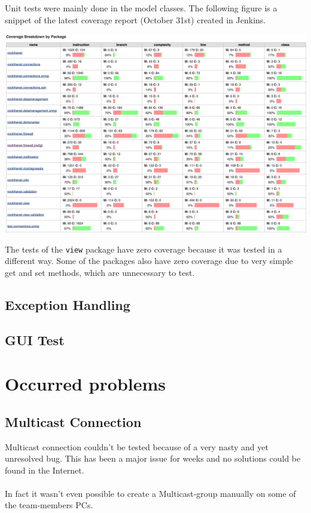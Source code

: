 \documentclass[11pt, a4paper]{article}
\begin{document}
Unit tests were mainly done in the model classes. The following figure is a snippet of the latest coverage report (October 31st) created in Jenkins. 

\includegraphics[width=\textwidth]{images/coverage}

The tests of the \lstinline|view| package have zero coverage because it was tested in a different way. Some of the packages also have zero coverage due to very simple get and set methods, which are unnecessary to test.  

\subsection{Exception Handling}
\subsection{GUI Test}

\section{Occurred problems}
\label{sec:problems}
\subsection{Multicast Connection}

Multicast connection couldn't be tested because of a very nasty and yet unresolved bug. This has been a major issue for weeks and no solutions could be found in the Internet. 
\\\\
In fact it wasn't even possible to create a Multicast-group manually on some of the team-members PCs.
\end{document}
